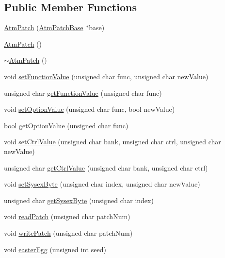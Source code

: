\subsection*{Public Member Functions}
\begin{DoxyCompactItemize}
\item 
\hyperlink{class_atm_patch_ad9b5a85c314ca968deae87ca43b087e9}{Atm\+Patch} (\hyperlink{class_atm_patch_base}{Atm\+Patch\+Base} $\ast$base)
\item 
\hyperlink{class_atm_patch_ac9d24dbe3f01ee12145649819017f697}{Atm\+Patch} ()
\item 
\hyperlink{class_atm_patch_ae37c93d358677907afbcc74c34469ba2}{$\sim$\+Atm\+Patch} ()
\item 
void \hyperlink{class_atm_patch_ad2fe7a265755afc95a36752b86b6a7e2}{set\+Function\+Value} (unsigned char func, unsigned char new\+Value)
\item 
unsigned char \hyperlink{class_atm_patch_a7b4184a7f5bd314e150f9ad38cc3a0fb}{get\+Function\+Value} (unsigned char func)
\item 
void \hyperlink{class_atm_patch_a1139606bcbffe63881b3f175f577d8e1}{set\+Option\+Value} (unsigned char func, bool new\+Value)
\item 
bool \hyperlink{class_atm_patch_ab521c0a108bf7f8bc848755c38330bc0}{get\+Option\+Value} (unsigned char func)
\item 
void \hyperlink{class_atm_patch_a95fb3ea0dfd3369abe7518da26edb1b5}{set\+Ctrl\+Value} (unsigned char bank, unsigned char ctrl, unsigned char new\+Value)
\item 
unsigned char \hyperlink{class_atm_patch_a5e8835fb80bdd1f130f129edde447d35}{get\+Ctrl\+Value} (unsigned char bank, unsigned char ctrl)
\item 
void \hyperlink{class_atm_patch_acc2729c3b10aa4d7f98e67caa3b80255}{set\+Sysex\+Byte} (unsigned char index, unsigned char new\+Value)
\item 
unsigned char \hyperlink{class_atm_patch_a48b5b2d71e4b83b80979a68372e935ae}{get\+Sysex\+Byte} (unsigned char index)
\item 
void \hyperlink{class_atm_patch_a9689db39f28d3c7d0fcaa6966c82e2d6}{read\+Patch} (unsigned char patch\+Num)
\item 
void \hyperlink{class_atm_patch_a5814cd528970cb153dd67865a6b86c85}{write\+Patch} (unsigned char patch\+Num)
\item 
void \hyperlink{class_atm_patch_ad7a325c544381189f9419131feba685b}{easter\+Egg} (unsigned int seed)
\end{DoxyCompactItemize}
